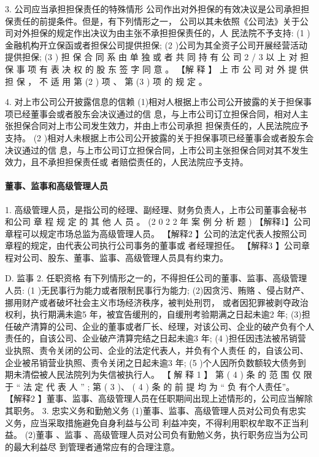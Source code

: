 \documentclass[UTF8,12pt]{ctexart}
\numberwithin{equation}{section} %
\numberwithin{figure}{section}
\numberwithin{table}{section}
\begin{document}
	3. 公司应当承担担保责任的特殊情形 公司作出对外担保的有效决议是公司承担担保责任的前提条件。但是，有下列情形之一， 公司以其未依照《公司法》关于公司对外担保的规定作出决议为由主张不承担担保责任的，人 民法院不予支持:
	(1 )金融机构开立保函或者担保公司提供担保;
	(2 )公司为其全资子公司开展经营活动提供担保;
	(3 ) 担 保 合 同 系 由 单 独 或 者 共 同 持 有 公 司 2 / 3 以 上 对 担 保 事 项 有 表 决 权 的 股 东 签 字 同 意 。
	【解 释 】 上 市 公 司 对 外 提 供 担 保 ， 不 适 用 第 (2 ) 项 、 第 (3 ) 项 的 规 定 。
	
	4. 对上市公司公开披露信息的信赖 (1)相对人根据上市公司公开披露的关于担保事项已经董事会或者股东会决议通过的信 息，与上市公司订立担保合同，相对人主张担保合同对上市公司发生效力，并由上市公司承担 担保责任的，人民法院应予支持。
	(2 )相对人未根据上市公司公开披露的关于担保事项已经董事会或者股东会决议通过的信 息，与上市公司订立担保合同，上市公司主张担保合同对其不发生效力，且不承担担保责任或 者赔偿责任的，人民法院应予支持。
	
	\paragraph{董事、监事和高级管理人员}
	1. 高级管理人员，是指公司的经理、副经理、财务负责人，上市公司董事会秘书和公司 章 程 规 定 的 其 他 人 员 。 (2 0 2 2 年 案 例 分 析 题 )
	【解释1】公司章程可以规定市场总监为高级管理人员。
	【解释2 】公司的法定代表人按照公司章程的规定，由代表公司执行公司事务的董事或 者经理担任。
	【解释3 】公司章程对公司、股东、董事、监事、高级管理人员具有约束力。
	
	D. 监事
	2. 任职资格
	有下列情形之一的，不得担任公司的董事、监事、高级管理人员:
	(1 )无民事行为能力或者限制民事行为能力;
	(2)因贪污、贿赂 、侵占财产、挪用财产或者破坏社会主义市场经济秩序，被判处刑罚， 或者因犯罪被剥夺政治权利，执行期满未逾5 年，被宜告缓刑的，自缓刑考验期满之日起未逾2 年; (3)担任破产清算的公司、企业的董事或者厂长、经理，对该公司、企业的破产负有个人 责任的，自该公司、企业破产清算完结之日起未逾3 年;
	(4 )担任因违法被吊销营业执照、责令关闭的公司、企业的法定代表人，并负有个人责任 的，自该公司、企业被吊销营业执照、责令关闭之日起未逾3 年;
	(5 )个人因所负数额较大债务到期未清偿被人民法院列为失信被执行人。
	【 解 释 1 】 第 ( 4 ) 条 的 范 围 仅 限 于 “ 法 定 代 表 人 ” ; 第 ( 3 )、 ( 4 ) 条 的 前 提 均 为 “ 负 有个人责任”。
	【解释2 】董事、监事、高级管理人员在任职期间出现上述情形的，公司应当解除其职务。
	3. 忠实义务和勤勉义务 (1)董事、监事、高级管理人员对公司负有忠实义务，应当采取措施避免自身利益与公司 利益冲突，不得利用职权牟取不正当利益。
	(2)董事 、监事 、高级管理人员对公司负有勤勉义务，执行职务应当为公司的最大利益尽 到管理者通常应有的合理注意。
	
\end{document}
